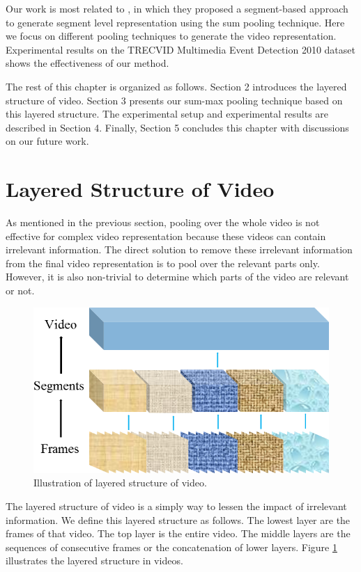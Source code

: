 Our work is most related to \cite{DBLP:journals/vlsisp/PhanNLTLDS14}, in which they proposed a segment-based approach to generate segment level representation using the sum pooling technique. Here we focus on different pooling techniques to generate the video representation. Experimental results on the TRECVID Multimedia Event Detection 2010 dataset shows the effectiveness of our method.

The rest of this chapter is organized as follows. Section 2 introduces the layered structure of video. Section 3 presents our sum-max pooling technique based on this layered structure. The experimental setup and experimental results are described in Section 4. Finally, Section 5 concludes this chapter with discussions on our future work.

\section{Layered Structure of Video} 
\label{sec:format}
As mentioned in the previous section, pooling over the whole video is not effective for complex video representation because these videos can contain irrelevant information. The direct solution to remove these irrelevant information from the final video representation is to pool over the relevant parts only. However, it is also non-trivial to determine which parts of the video are relevant or not. 
\begin{figure}[!htb]
	\centering
	\includegraphics[width=1\textwidth]{layered.png}
	\caption{Illustration of layered structure of video.}
	\label{f_layer}
\end{figure}

The layered structure of video is a simply way to lessen the impact of irrelevant information. We define this layered structure as follows. The lowest layer are the frames of that video. The top layer is the entire video. The middle layers are the sequences of consecutive frames or the concatenation of lower layers. Figure \ref{f_layer} illustrates the layered structure in videos.

